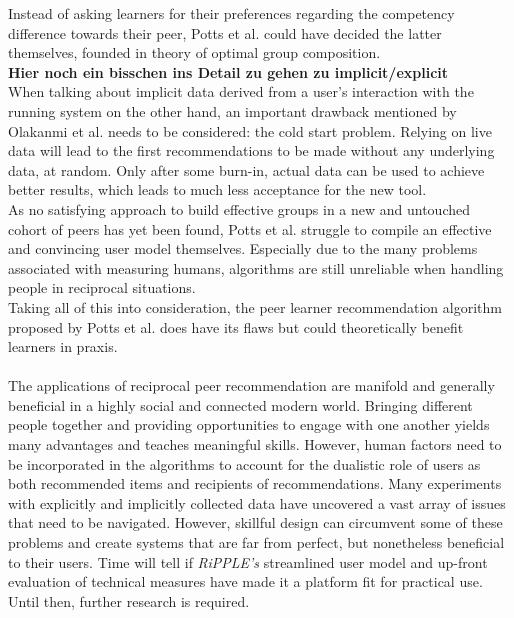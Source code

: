 \documentclass[conference]{IEEEtran}
\begin{document}
Instead of asking learners for their preferences regarding the competency difference towards their peer, Potts et al. could have decided the latter themselves, founded in theory of optimal group composition. \cite{manske2015using}\\
\textbf{Hier noch ein bisschen ins Detail zu gehen zu implicit/explicit}\\
When talking about implicit data derived from a user's interaction with the running system on the other hand, an important drawback mentioned by Olakanmi et al. needs to be considered: the cold start problem. \cite{olakanmi2017group} Relying on live data will lead to the first recommendations to be made without any underlying data, at random. Only after some burn-in, actual data can be used to achieve better results, which leads to much less acceptance for the new tool.\\
As no satisfying approach to build effective groups in a new and untouched cohort of peers has yet been found, Potts et al. struggle to compile an effective and convincing user model themselves. Especially due to the many problems associated with measuring humans, algorithms are still unreliable when handling people in reciprocal situations.\\ 
Taking all of this into consideration, the peer learner recommendation algorithm proposed by Potts et al. does have its flaws but could theoretically benefit learners in praxis.\\
\\
The applications of reciprocal peer recommendation are manifold and generally beneficial in a highly social and connected modern world. Bringing different people together and providing opportunities to engage with one another yields many advantages and teaches meaningful skills. However, human factors need to be incorporated in the algorithms to account for the dualistic role of users as both recommended items and recipients of recommendations. Many experiments with explicitly and implicitly collected data have uncovered a vast array of issues that need to be navigated. However, skillful design can circumvent some of these problems and create systems that are far from perfect, but nonetheless beneficial to their users. Time will tell if \textit{RiPPLE's} streamlined user model and up-front evaluation of technical measures have made it a platform fit for practical use. Until then, further research is required.\\
\end{document}
